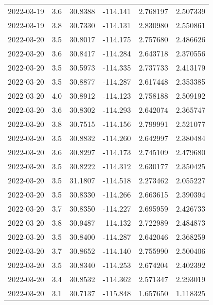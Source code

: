 \begin{tabular}{lrrrrr}
2022-03-19 &       3.6 &  30.8388 &  -114.141 &         2.768197 &         2.507339 \\
2022-03-19 &       3.8 &  30.7330 &  -114.131 &         2.830980 &         2.550861 \\
2022-03-20 &       3.5 &  30.8017 &  -114.175 &         2.757680 &         2.486626 \\
2022-03-20 &       3.6 &  30.8417 &  -114.284 &         2.643718 &         2.370556 \\
2022-03-20 &       3.5 &  30.5973 &  -114.335 &         2.737733 &         2.413179 \\
2022-03-20 &       3.5 &  30.8877 &  -114.287 &         2.617448 &         2.353385 \\
2022-03-20 &       4.0 &  30.8912 &  -114.123 &         2.758188 &         2.509192 \\
2022-03-20 &       3.6 &  30.8302 &  -114.293 &         2.642074 &         2.365747 \\
2022-03-20 &       3.8 &  30.7515 &  -114.156 &         2.799991 &         2.521077 \\
2022-03-20 &       3.5 &  30.8832 &  -114.260 &         2.642997 &         2.380484 \\
2022-03-20 &       3.6 &  30.8297 &  -114.173 &         2.745109 &         2.479680 \\
2022-03-20 &       3.5 &  30.8222 &  -114.312 &         2.630177 &         2.350425 \\
2022-03-20 &       3.5 &  31.1807 &  -114.518 &         2.273462 &         2.055227 \\
2022-03-20 &       3.5 &  30.8330 &  -114.266 &         2.663615 &         2.390394 \\
2022-03-20 &       3.7 &  30.8350 &  -114.227 &         2.695959 &         2.426733 \\
2022-03-20 &       3.8 &  30.9487 &  -114.132 &         2.722989 &         2.484873 \\
2022-03-20 &       3.5 &  30.8400 &  -114.287 &         2.642046 &         2.368259 \\
2022-03-20 &       3.7 &  30.8652 &  -114.140 &         2.755990 &         2.500406 \\
2022-03-20 &       3.5 &  30.8340 &  -114.253 &         2.674204 &         2.402392 \\
2022-03-20 &       3.4 &  30.8532 &  -114.362 &         2.571347 &         2.293019 \\
2022-03-20 &       3.1 &  30.7137 &  -115.848 &         1.657650 &         1.118325 \\

\end{tabular}
